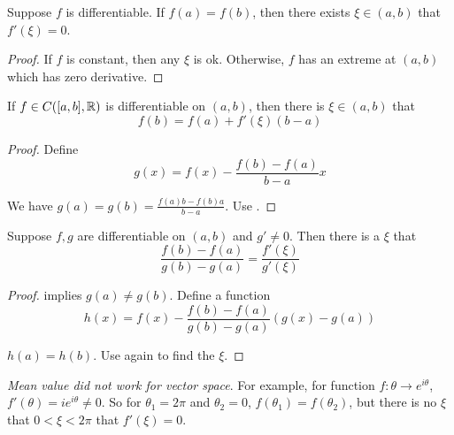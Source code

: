 \begin{theorem}\label{rolle_theorem}
    Suppose $f$ is differentiable. If $f(a) = f(b)$, then there exists $\xi \in (a,b)$ that $f'(\xi) = 0$.
\end{theorem}
\begin{proof}
    If $f$ is constant, then any $\xi$ is ok. Otherwise, $f$ has an extreme at $(a,b)$ which has zero derivative.
\end{proof}

\begin{theorem}
    If $f \in C([a,b], \mathbb{R})$ is differentiable on $(a,b)$, then there is $\xi \in (a,b)$ that
    \begin{equation}
        f(b) = f(a) + f'(\xi)(b-a)
    \end{equation}
\end{theorem}
\begin{proof}
    Define 
    \begin{equation}
        g(x) = f(x) - \frac{f(b) - f(a)}{b-a}x
    \end{equation}
    
    We have $g(a) = g(b) = \frac{f(a)b - f(b) a}{b-a}$. Use .
\end{proof}


\begin{theorem}
    Suppose $f,g$ are differentiable on $(a,b)$ and $g' \neq 0$. Then there is a $\xi$ that
    \begin{equation}
        \frac{f(b) - f(a)}{g(b) - g(a)} = \frac{f'(\xi)}{g'(\xi)}
    \end{equation}
\end{theorem}
\begin{proof}
     implies $g(a) \neq g(b)$. Define a function 
    \begin{equation}
        h(x) = f(x) - \frac{f(b) - f(a)}{g(b) - g(a)}(g(x) - g(a))
    \end{equation}
    
    $h(a) = h(b)$. Use  again to find the $\xi$.
\end{proof}

\begin{example}
    \emph{Mean value did not work for vector space}. For example, for function $f: \theta \rightarrow e^{i\theta}$, $f'(\theta) = i e^{i\theta} \neq 0$. So for $\theta_1 = 2\pi$ and $\theta_2 = 0$, $f(\theta_1) = f(\theta_2)$, but there is no $\xi$ that $0 < \xi < 2\pi$ that $f'(\xi) = 0$.
\end{example}


